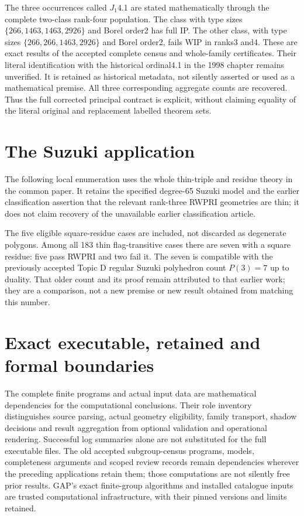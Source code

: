 \documentclass[11pt,a4paper]{article}
\begin{document}
The three occurrences called $J_1$4.1 are stated mathematically through
the complete two-class rank-four population. The class with type sizes
$\{266,1463,1463,2926\}$ and Borel order2 has full IP. The other class,
with type sizes $\{266,266,1463,2926\}$ and Borel order2, fails WIP
in ranks3 and4. These are exact results of the accepted complete
census and whole-family certificates. Their literal identification with
the historical ordinal4.1 in the 1998 chapter remains unverified.
It is retained as historical metadata, not silently asserted or used as
a mathematical premise. All three corresponding aggregate counts are
recovered. Thus the full corrected principal contract is explicit,
without claiming equality of the literal original and replacement
labelled theorem sets.

\section{The Suzuki application}
The following local enumeration uses the whole thin-triple and residue
theory in the common paper. It retains the specified degree-65 Suzuki
model and the earlier classification assertion that the relevant
rank-three RWPRI geometries are thin; it does not claim recovery of
the unavailable earlier classification article.

The five eligible square-residue cases are included, not discarded as
degenerate polygons. Among all 183 thin flag-transitive cases there are
seven with a square residue: five pass RWPRI and two fail it. The seven
is compatible with the previously accepted Topic D regular Suzuki
polyhedron count $P(3)=7$ up to duality. That older count and its proof
remain attributed to that earlier work; they are a comparison, not a
new premise or new result obtained from matching this number.



\section{Exact executable, retained and formal boundaries}
The complete finite programs and actual input data are mathematical
dependencies for the computational conclusions. Their role inventory
distinguishes source parsing, actual geometry eligibility, family
transport, shadow decisions and result aggregation from optional
validation and operational rendering. Successful log summaries alone
are not substituted for the full executable files. The old accepted
subgroup-census programs, models, completeness arguments and scoped
review records remain dependencies wherever the preceding applications
retain them; those computations are not silently free prior results.
GAP's exact finite-group algorithms and installed catalogue inputs are
trusted computational infrastructure, with their pinned versions and
limits retained.
\end{document}

